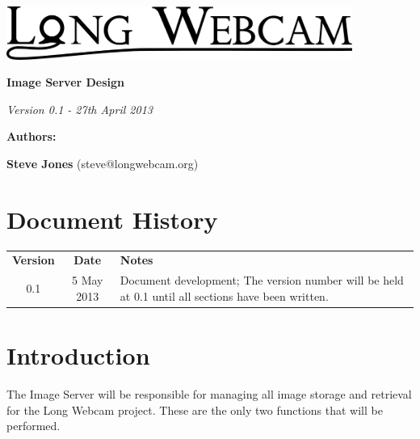 \documentclass[11pt]{article}
\begin{document}
\begin{titlepage}
\begin{center}

\includegraphics[width=0.85\textwidth]{./Logo_Large-cropped_black.png}

\vspace{3 cm}

\textbf{\Huge{Image Server Design}}

\vspace{1 cm}

\textit{\large{Version 0.1 - 27th April 2013}}

\vspace{4 cm}

\textbf{\Large{Authors:}}

\textbf{Steve Jones} (steve@longwebcam.org)

\end{center}

\end{titlepage}

\setcounter{tocdepth}{2}
\tableofcontents
\clearpage
{}
\section*{Document History}
\begin{table}[tbhp!]
\begin{tabular}{ c c p{4in} }
\textbf{Version} & \textbf{Date} & \textbf{Notes} \\
0.1 & 5 May 2013 & Document development; The version number will be held at 0.1 until all sections have been written. \\
\end{tabular}
\end{table}

\clearpage
{}

\section{Introduction}
The Image Server will be responsible for managing all image storage and retrieval for the Long Webcam project. These are the only two functions that will be performed.
\end{document}
